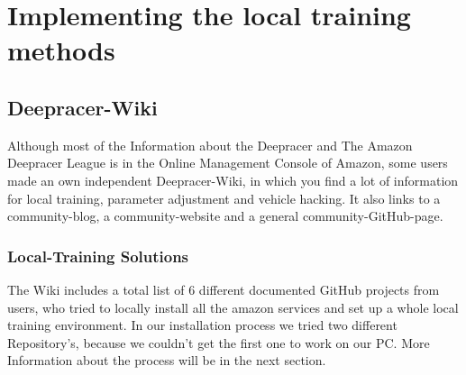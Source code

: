 \section{Implementing the local training methods}

\subsection{Deepracer-Wiki}
Although most of the Information about the Deepracer and The Amazon Deepracer League is in the Online Management Console of Amazon, some users made an own independent Deepracer-Wiki, in which you find a lot of information for local training, parameter adjustment and vehicle hacking. It also links to a community-blog, a community-website and a general community-GitHub-page. 

\subsubsection{Local-Training Solutions}
The Wiki includes a total list of 6 different documented GitHub projects from users, who tried to locally install all the amazon services and set up a whole local training environment. In our installation process we tried two different Repository's, because we couldn't get the first one to work on our PC. More Information about the process will be in the next section.

